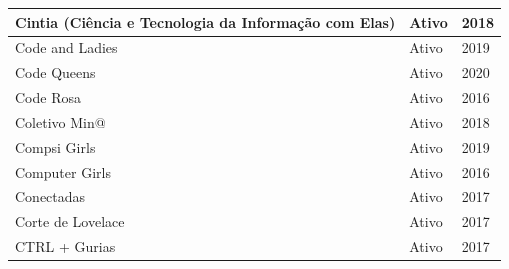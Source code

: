 \begin{longtable}{|l|l|l|}
Cintia (Ciência e Tecnologia da Informação com Elas)                                                                                                        & Ativo                        & 2018                        \\ \hline
Code and Ladies                                                                                                                                             & Ativo                        & 2019                        \\ \hline
Code Queens                                                                                                                                                 & Ativo                        & 2020                        \\ \hline
Code Rosa                                                                                                                                                   & Ativo                        & 2016                        \\ \hline
  
Coletivo Min@                                                                                                                                               & Ativo                        & 2018                        \\ \hline
Compsi Girls                                                                                                                                                & Ativo                        & 2019                        \\ \hline
Computer Girls                                                                                                                                              & Ativo                        & 2016                        \\ \hline
  
Conectadas                                                                                                                                                  & Ativo                        & 2017                        \\ \hline
  
Corte de Lovelace                                                                                                                                           & Ativo                        & 2017                        \\ \hline
CTRL + Gurias                                                                                                                                               & Ativo                        & 2017                        \\ \hline
  

\end{longtable}

